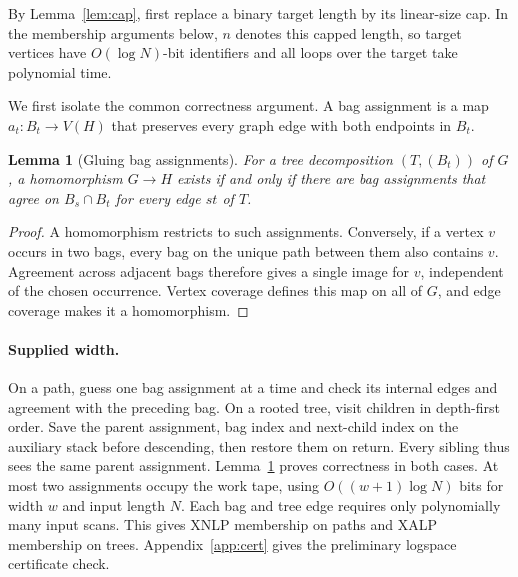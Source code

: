 \documentclass[11pt]{article}
\newtheorem{lemma}[theorem]{Lemma}
\theoremstyle{remark}
\begin{document}
By Lemma~\ref{lem:cap}, first replace a binary target length by its
linear-size cap. In the membership arguments below, $n$ denotes this
capped length, so target vertices have $O(\log N)$-bit identifiers and
all loops over the target take polynomial time.

We first isolate the common correctness argument. A bag assignment is a
map $a_t:B_t\to V(H)$ that preserves every graph edge with both endpoints
in $B_t$.

\begin{lemma}[Gluing bag assignments]\label{lem:bags}
For a tree decomposition $(T,(B_t))$ of $G$, a homomorphism $G\to H$
exists if and only if there are bag assignments that agree on
$B_s\cap B_t$ for every edge $st$ of $T$.
\end{lemma}
\begin{proof}
A homomorphism restricts to such assignments. Conversely, if a vertex
$v$ occurs in two bags, every bag on the unique path between them also
contains $v$. Agreement across adjacent bags therefore gives a single
image for $v$, independent of the chosen occurrence. Vertex coverage
defines this map on all of $G$, and edge coverage makes it a homomorphism.
\end{proof}

\paragraph{Supplied width.}
On a path, guess one bag assignment at a time and check its internal edges
and agreement with the preceding bag. On a rooted tree, visit children in
depth-first order. Save the parent assignment, bag index and next-child
index on the auxiliary stack before descending, then restore them on return.
Every sibling thus sees the same parent assignment. Lemma~\ref{lem:bags}
proves correctness in both cases. At most two assignments occupy the work
tape, using $O((w+1)\log N)$ bits for width $w$ and input length $N$.
Each bag and tree edge requires only polynomially many input scans.
This gives XNLP membership on paths and XALP membership on trees.
Appendix~\ref{app:cert} gives the preliminary logspace certificate check.
\end{document}

